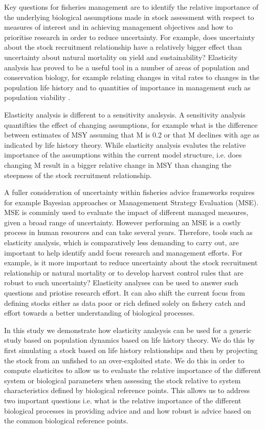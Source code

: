 \documentclass[10pt]{article}
\begin{document}
Key questions for fisheries management are to identify the relative importance of the underlying biological assumptions made in stock assessment 
with respect to measures of interest and in achieving management objectives and how to prioritise research in order to reduce uncertainty.
For example, does uncertainty about the stock recruitment relationship have a relatively bigger effect than uncertainty about natural mortality 
on yield and sustainability? Elasticity analysis has  proved to be a useful tool in a number of areas of 
population and conservation biology, for example relating changes in vital rates to changes in the population life history \cite{grant2003density}
and to quantities of importance in management such as population viability \cite{heppell1998application}.  

Elasticity analysis is different to a sensitivity analsysis. A sensitivity analysis quantifties the effect of changing assumptions, for example 
what is the difference between estimates of MSY assuming that M is 0.2 or that M declines with age as indicated by life history theory.
While elasticity analysis evalutes the relative importance of the assumptions within the current model structure, i.e. does changing
M result in a bigger relative change in MSY than changing the steepness of the stock recruitment relationship.

A fuller consideration of uncertainty within fisheries advice frameworks requires for example Bayesian approaches or Managemement Strategy Evaluation (MSE).
MSE is comminly used to evaluate the impact of different managed measures,  given a broad range of uncertainty. However
performing an MSE is a costly process in human resources and can take several years. Therefore, tools such as elasticity analysis, which
is comparatively less demanding to carry out, are important to 
help identify andd focus research and management efforts. For example, is it more important to reduce uncertainty about the stock 
recruitment relationship or natural mortality or to develop harvest control rules that are robust to such uncertainty? Elasticity analyses can 
be used to answer such questions and priotise research effort. It can also shift the current focus from defining stocks either as data poor or rich 
defined solely on fishery catch and effort towards a better understanding of biological processes. 

In this study we demonstrate how elasticity analsysis can be used for a generic study based on population dynamics based on life history theory.
We do this by first simulating a stock based on life history relationships \cite{gislason2008does} 
and then by projecting the stock from an unfished to 
an over-exploited state. We do this in order to compute elasticites to allow us to evaluate the relative importance of the different system or biological parameters
when assessing the stock relative to system characteristics defined by biological reference points. This allows us to address two important questions i.e. what is
the relative importance of the different biological processes in providing advice and and how robust is advice based on the common biological reference 
points.
\end{document}

